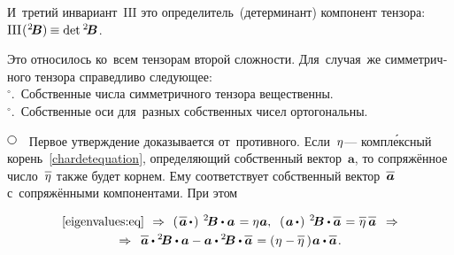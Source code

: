 \begin{otherlanguage}{russian}
\vspace{-0.3em} \noindent
И~третий инвариант~${\mathrm{III}}$ это определитель~(детерминант) компонент тензора:
${\mathrm{III}\hspace{.16ex}(\hspace{.1ex}{^2\!\bm{B}}) \hspace{-0.12ex}
\equiv \operatorname{det}\hspace{.1ex} {^2\!\bm{B}}}$.

Это относилось ко~всем тензорам второй сложности. Для~случая~же симметричного тензора справедливо следующее:\\
$^{\circ}$\hspace{-1ex}.\, Собственные числа симметричного тензора вещественны.\\
$^{\circ}$\hspace{-1ex}.\, Собственные оси для~разных собственных чисел ортогональны.

\noindent
${ \tikz[baseline=-1ex] \draw [line width=.5pt, color=black, fill=white] (0, 0) circle (.8ex);
\hspace{.6em} }$
Первое утверждение доказывается от~противного. Если~$\eta\hspace{.1ex}$\:--- компл\'{е}ксный корень~\eqref{chardetequation}, определяющий собственный вектор~$\bm{a}$, то сопряжённое число~$\lineover{\eigenvalue}$ также будет корнем. Ему соответствует собственный вектор~$\lineover{\bm{a}}$ с~сопряжёнными компонентами. При этом

\nopagebreak\vspace{-0.5em}\begin{multline*}
\eqref{eigenvalues:eq}
\:\,\Rightarrow\:\,
\left(\hspace{.25ex} {\lineover{\bm{a}} \, \dotp} \hspace{.25ex}\right) \hspace{.5ex} {^2\!\bm{B}} \dotp \bm{a} \hspace{.2ex} = \eigenvalue \bm{a}, \;\;
\left(\hspace{.2ex}{\bm{a} \, \dotp}\hspace{.2ex}\right) \hspace{.5ex} {^2\!\bm{B}} \dotp \lineover{\bm{a}} \hspace{.2ex} = \hspace{.1ex} \lineover{\eigenvalue} \, \lineover{\bm{a}}
\:\;\Rightarrow \\[-0.1em]
%
\Rightarrow\;\: \lineover{\bm{a}} \dotp {^2\!\bm{B}} \dotp \bm{a} - \bm{a} \dotp {^2\!\bm{B}} \dotp \lineover{\bm{a}} \hspace{.2ex} = \left(\hspace{.1ex}{\eigenvalue - \lineover{\eigenvalue}}\hspace{.16em}\right)\hspace{-0.1em} \bm{a} \dotp \lineover{\bm{a}} \hspace{.2ex} .
\end{multline*}


\end{otherlanguage}
